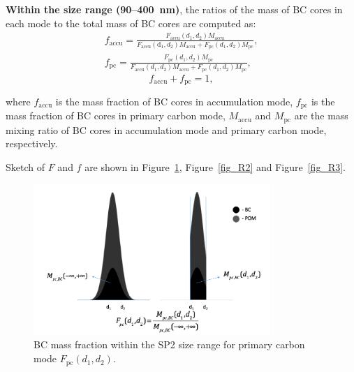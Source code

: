 \documentclass[12pt, fullpage]{uiucthesis2009_2}
\begin{document}
	\textbf{Within the size range (90--400~nm)}, the ratios of the mass of BC cores in each mode to the total mass of BC cores are computed as:
	\begin{align*}
	f_{\text{accu}} = \frac{F_{\text{accu}}(d_{1}, d_{2})M_{\text{accu}}}{F_{\text{accu}}(\text{d}_{1}, d_{2})M_{\text{accu}}+F_{\text{pc}}(d_{1}, d_{2})M_{\text{pc}}},\\
	f_{\text{pc}} = \frac{F_{\text{pc}}(d_{1}, d_{2})M_{\text{pc}}}{F_{\text{accu}}(d_{1}, d_{2})M_{\text{accu}}+F_{\text{pc}}(d_{1}, d_{2})M_{\text{pc}}},
	\end{align*}
	\[f_{\text{accu}} + f_{\text{pc}} = 1,\]
	
	where $f_{\text{accu}}$ is the mass fraction of BC cores in
	accumulation mode, $f_{\text{pc}}$ is the mass fraction of BC cores in
	primary carbon mode, $M_{\text{accu}}$ and $M_{\text{pc}}$ are the mass mixing ratio of BC cores
	in accumulation mode and primary carbon mode, respectively.
	
	Sketch of $F$ and $f$ are shown in Figure~\ref{fig_R1}, Figure~\ref{fig_R2} and Figure~\ref{fig_R3}.
	
	\begin{figure}[h] 
		\begin{center}
			\includegraphics[width = 0.8\textwidth]{Rplot05}
			\caption[BC mass fraction within the SP2 size range for primary carbon mode $F_{\text{pc}}(d_{1}, d_{2})$]{\label{fig_R1} BC mass fraction within the SP2 size range for primary carbon mode $F_{\text{pc}}(d_{1}, d_{2})$.}
		\end{center}
	\end{figure}
	
\end{document}
